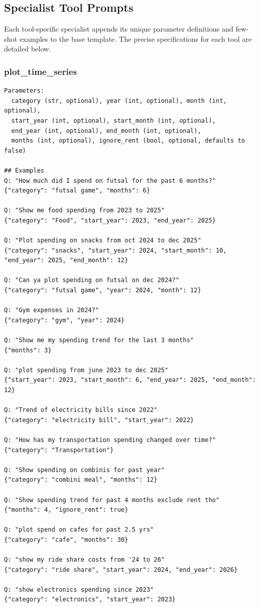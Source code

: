 \documentclass[11pt,twocolumn]{article}
\begin{document}
\subsection{Specialist Tool Prompts}
\label{sec:tool_prompts_appendix}
Each tool-specific specialist appends its unique parameter definitions and few-shot examples to the base template. The precise specifications for each tool are detailed below.

\subsubsection{plot\_time\_series}
\begin{scriptsize}
\begin{verbatim}
Parameters:
  category (str, optional), year (int, optional), month (int, optional),
  start_year (int, optional), start_month (int, optional),
  end_year (int, optional), end_month (int, optional),
  months (int, optional), ignore_rent (bool, optional, defaults to false)

## Examples
Q: "How much did I spend on futsal for the past 6 months?"
{"category": "futsal game", "months": 6}

Q: "Show me food spending from 2023 to 2025"
{"category": "Food", "start_year": 2023, "end_year": 2025}

Q: "Plot spending on snacks from oct 2024 to dec 2025"
{"category": "snacks", "start_year": 2024, "start_month": 10, "end_year": 2025, "end_month": 12}

Q: "Can ya plot spending on futsal on dec 2024?"
{"category": "futsal game", "year": 2024, "month": 12}

Q: "Gym expenses in 2024?"
{"category": "gym", "year": 2024}

Q: "Show me my spending trend for the last 3 months"
{"months": 3}

Q: "plot spending from june 2023 to dec 2025"
{"start_year": 2023, "start_month": 6, "end_year": 2025, "end_month": 12}

Q: "Trend of electricity bills since 2022"
{"category": "electricity bill", "start_year": 2022}

Q: "How has my transportation spending changed over time?"
{"category": "Transportation"}

Q: "Show spending on combinis for past year"
{"category": "combini meal", "months": 12}

Q: "Show spending trend for past 4 months exclude rent tho"
{"months": 4, "ignore_rent": true}

Q: "plot spend on cafes for past 2.5 yrs"
{"category": "cafe", "months": 30}

Q: "show my ride share costs from '24 to 26"
{"category": "ride share", "start_year": 2024, "end_year": 2026}

Q: "show electronics spending since 2023"
{"category": "electronics", "start_year": 2023}
\end{verbatim}
\end{scriptsize}
\end{document}
